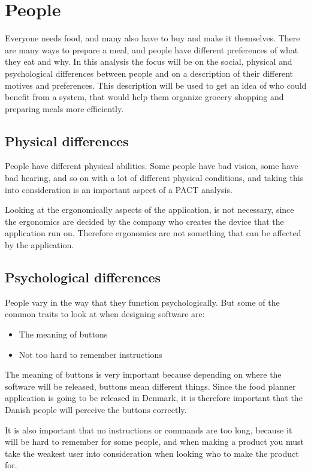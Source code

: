 \section{People}
Everyone needs food, and many also have to buy and make it themselves. There are many ways to prepare a meal, and people have different preferences of what they eat and why. In this analysis the focus will be on the social, physical and psychological differences between people and on a description of their different motives and preferences. This description will be used to get an idea of who could benefit from a system, that would help them organize grocery shopping and preparing meals more efficiently.

\subsection{Physical differences}

People have different physical abilities. Some people have bad vision, some have bad hearing, and so on with a lot of different physical conditions, and taking this into consideration is an important aspect of a PACT analysis.

Looking at the ergonomically aspects of the application, is not necessary, since the ergonomics are decided by the company who creates the device that the application run on. Therefore ergonomics are not something that can be affected by the application.

\subsection{Psychological differences}

People vary in the way that they function psychologically. But some of the common traits to look at when designing software are:

\begin{itemize}
    \item The meaning of buttons
    \item Not too hard to remember instructions
\end{itemize}

The meaning of buttons is very important because depending on where the software will be released, buttons mean different things. Since the food planner application is going to be released in Denmark, it is therefore important that the Danish people will perceive the buttons correctly.

It is also important that no instructions or commands are too long, because it will be hard to remember for some people, and when making a product you must take the weakest user into consideration when looking who to make the product for.


